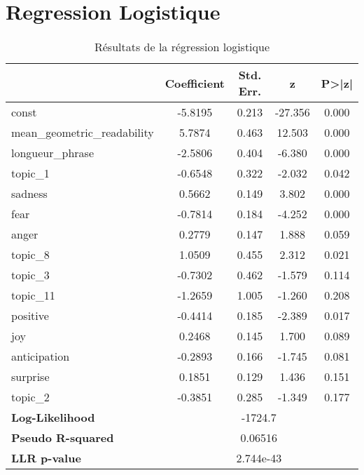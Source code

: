 \documentclass[12pt,a4paper,oneside,titlepage]{book} %
\begin{document}
\chapter{Regression Logistique}
\begin{table}[htbp]
	\centering
	\caption{Résultats de la régression logistique}
	\begin{tabular}{lcccc}
		\toprule
		& \textbf{Coefficient} & \textbf{Std. Err.} & \textbf{z} & \textbf{P>|z|} \\
		\midrule
		const                        & -5.8195 & 0.213 & -27.356 & 0.000 \\
		mean\_geometric\_readability & 5.7874  & 0.463 & 12.503  & 0.000 \\
		longueur\_phrase             & -2.5806 & 0.404 & -6.380  & 0.000 \\
		topic\_1                     & -0.6548 & 0.322 & -2.032  & 0.042 \\
		sadness                      & 0.5662  & 0.149 & 3.802   & 0.000 \\
		fear                         & -0.7814 & 0.184 & -4.252  & 0.000 \\
		anger                        & 0.2779  & 0.147 & 1.888   & 0.059 \\
		topic\_8                     & 1.0509  & 0.455 & 2.312   & 0.021 \\
		topic\_3                     & -0.7302 & 0.462 & -1.579  & 0.114 \\
		topic\_11                    & -1.2659 & 1.005 & -1.260  & 0.208 \\
		positive                     & -0.4414 & 0.185 & -2.389  & 0.017 \\
		joy                          & 0.2468  & 0.145 & 1.700   & 0.089 \\
		anticipation                 & -0.2893 & 0.166 & -1.745  & 0.081 \\
		surprise                     & 0.1851  & 0.129 & 1.436   & 0.151 \\
		topic\_2                     & -0.3851 & 0.285 & -1.349  & 0.177 \\
		\midrule
		\textbf{Log-Likelihood}      & \multicolumn{4}{c}{-1724.7} \\
		\textbf{Pseudo R-squared}    & \multicolumn{4}{c}{0.06516} \\
		\textbf{LLR p-value}         & \multicolumn{4}{c}{2.744e-43} \\
		\bottomrule
	\end{tabular}
	\label{table:logit}
\end{table}
\end{document}
